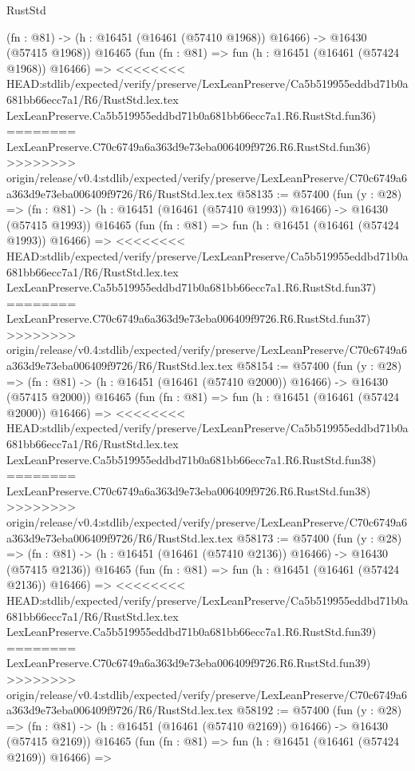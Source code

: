 \begin{lexlean}{RustStd}
\begin{coremodule}
{\begin{coremodule}
{{{{{{{{{{{{{{{{{{{{{{{{{{{{{{{{{{{{{{{{{{{{{{{{{{{{{{{    (fn : @81) -> (h : @16451 (@16461 (@57410 @1968)) @16466) -> @16430 (@57415 @1968))
    @16465
    (fun (fn : @81) =>
    fun (h : @16451 (@16461 (@57424 @1968)) @16466) =>
<<<<<<<< HEAD:stdlib/expected/verify/preserve/LexLeanPreserve/Ca5b519955eddbd71b0a681bb66ecc7a1/R6/RustStd.lex.tex
    LexLeanPreserve.Ca5b519955eddbd71b0a681bb66ecc7a1.R6.RustStd.fun36)
========
    LexLeanPreserve.C70c6749a6a363d9e73eba006409f9726.R6.RustStd.fun36)
>>>>>>>> origin/release/v0.4:stdlib/expected/verify/preserve/LexLeanPreserve/C70c6749a6a363d9e73eba006409f9726/R6/RustStd.lex.tex
@58135 := @57400
    (fun (y : @28) =>
    (fn : @81) -> (h : @16451 (@16461 (@57410 @1993)) @16466) -> @16430 (@57415 @1993))
    @16465
    (fun (fn : @81) =>
    fun (h : @16451 (@16461 (@57424 @1993)) @16466) =>
<<<<<<<< HEAD:stdlib/expected/verify/preserve/LexLeanPreserve/Ca5b519955eddbd71b0a681bb66ecc7a1/R6/RustStd.lex.tex
    LexLeanPreserve.Ca5b519955eddbd71b0a681bb66ecc7a1.R6.RustStd.fun37)
========
    LexLeanPreserve.C70c6749a6a363d9e73eba006409f9726.R6.RustStd.fun37)
>>>>>>>> origin/release/v0.4:stdlib/expected/verify/preserve/LexLeanPreserve/C70c6749a6a363d9e73eba006409f9726/R6/RustStd.lex.tex
@58154 := @57400
    (fun (y : @28) =>
    (fn : @81) -> (h : @16451 (@16461 (@57410 @2000)) @16466) -> @16430 (@57415 @2000))
    @16465
    (fun (fn : @81) =>
    fun (h : @16451 (@16461 (@57424 @2000)) @16466) =>
<<<<<<<< HEAD:stdlib/expected/verify/preserve/LexLeanPreserve/Ca5b519955eddbd71b0a681bb66ecc7a1/R6/RustStd.lex.tex
    LexLeanPreserve.Ca5b519955eddbd71b0a681bb66ecc7a1.R6.RustStd.fun38)
========
    LexLeanPreserve.C70c6749a6a363d9e73eba006409f9726.R6.RustStd.fun38)
>>>>>>>> origin/release/v0.4:stdlib/expected/verify/preserve/LexLeanPreserve/C70c6749a6a363d9e73eba006409f9726/R6/RustStd.lex.tex
@58173 := @57400
    (fun (y : @28) =>
    (fn : @81) -> (h : @16451 (@16461 (@57410 @2136)) @16466) -> @16430 (@57415 @2136))
    @16465
    (fun (fn : @81) =>
    fun (h : @16451 (@16461 (@57424 @2136)) @16466) =>
<<<<<<<< HEAD:stdlib/expected/verify/preserve/LexLeanPreserve/Ca5b519955eddbd71b0a681bb66ecc7a1/R6/RustStd.lex.tex
    LexLeanPreserve.Ca5b519955eddbd71b0a681bb66ecc7a1.R6.RustStd.fun39)
========
    LexLeanPreserve.C70c6749a6a363d9e73eba006409f9726.R6.RustStd.fun39)
>>>>>>>> origin/release/v0.4:stdlib/expected/verify/preserve/LexLeanPreserve/C70c6749a6a363d9e73eba006409f9726/R6/RustStd.lex.tex
@58192 := @57400
    (fun (y : @28) =>
    (fn : @81) -> (h : @16451 (@16461 (@57410 @2169)) @16466) -> @16430 (@57415 @2169))
    @16465
    (fun (fn : @81) =>
    fun (h : @16451 (@16461 (@57424 @2169)) @16466) =>
}}}}}}}}}}}}}}}}}}}}}}}}}}}}}}}}}}}}}}}}}}}}}}}}}}}}}}}
\end{coremodule}}
\end{coremodule}
\end{lexlean}
